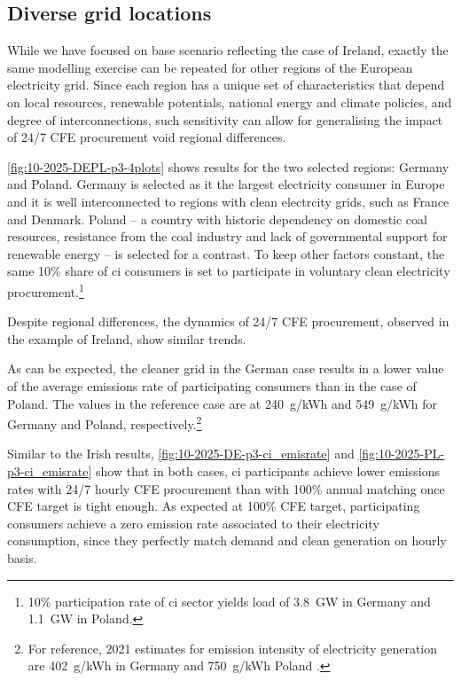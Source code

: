 \subsection{Diverse grid locations}
\label{subsec:location}

While we have focused on base scenario reflecting the case of Ireland, exactly the same modelling exercise can be repeated for other regions of the European electricity grid.
Since each region has a unique set of characteristics that depend on local resources, renewable potentials, national energy and climate policies, and degree of interconnections, such sensitivity can allow for generalising the impact of 24/7 CFE procurement void regional differences.

\cref{fig:10-2025-DEPL-p3-4plots} shows results for the two selected regions: Germany and Poland. Germany is selected as it the largest electricity consumer in Europe and it is well interconnected to regions with clean electrcity grids, such as France and Denmark. 
Poland -- a country with  historic dependency on domestic coal resources, resistance from the coal industry and lack of governmental support for renewable energy -- is selected for a contrast. To keep other factors constant, the same 10\% share of \gls{ci} consumers is set to participate in voluntary clean electricity procurement.\footnote{10\% participation rate of \gls{ci} sector yields load of 3.8~GW in Germany and 1.1~GW in Poland.}

Despite regional differences, the dynamics of 24/7 CFE procurement, observed in the example of Ireland, show similar trends. 

As can be expected, the cleaner grid in the German case results in a lower value of the average emissions rate of participating consumers than in the case of Poland. The values in the reference case are at 240~g\co/kWh and 549~g\co/kWh for Germany and Poland, respectively.\footnote{For reference, 2021 estimates for emission intensity of electricity generation are 402~g\co/kWh in Germany and 750~g\co/kWh Poland \cite{EEA-europa-web}.}

Similar to the Irish results, \cref{fig:10-2025-DE-p3-ci_emisrate} and \cref{fig:10-2025-PL-p3-ci_emisrate} show that in both cases, \gls{ci} participants achieve lower emissions rates with 24/7 hourly CFE procurement than with 100\% annual matching once CFE target is tight enough. As expected at 100\% CFE target, participating consumers achieve a zero emission rate associated to their electricity consumption, since they perfectly match demand and clean generation on hourly basis.

